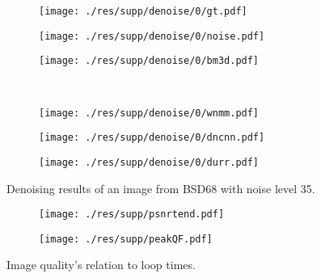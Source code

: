 \documentclass{article} %
\begin{document}
\begin{figure}[htp!]
	\centering
	\begin{subfigure}[t]{0.28\textwidth}
		\centering
		\texttt{[image: ./res/supp/denoise/0/gt.pdf]}
	\end{subfigure}
	\quad
	\begin{subfigure}[t]{0.28\textwidth}
		\centering
		\texttt{[image: ./res/supp/denoise/0/noise.pdf]}
	\end{subfigure}
	\quad
	\begin{subfigure}[t]{0.28\textwidth}
		\centering
		\texttt{[image: ./res/supp/denoise/0/bm3d.pdf]}
	\end{subfigure}\\
	\begin{subfigure}[t]{0.28\textwidth}
		\centering
		\texttt{[image: ./res/supp/denoise/0/wnmm.pdf]}
	\end{subfigure}
	\quad
	\begin{subfigure}[t]{0.28\textwidth}
		\centering
		\texttt{[image: ./res/supp/denoise/0/dncnn.pdf]}
	\end{subfigure}
	\quad
	\begin{subfigure}[t]{0.28\textwidth}
		\centering
		\texttt{[image: ./res/supp/denoise/0/durr.pdf]}
	\end{subfigure}
\caption{Denoising results of an image from BSD68 with
	noise level 35.}
\label{dn2}
	
	
	
\end{figure}

\begin{figure}[hp!]
	\centering
	\begin{subfigure}[t]{0.48\textwidth}
		\centering
		\texttt{[image: ./res/supp/psnrtend.pdf]}
	\end{subfigure}
	\quad
	\begin{subfigure}[t]{0.48\textwidth}
		\centering
		\texttt{[image: ./res/supp/peakQF.pdf]}
	\end{subfigure}
	\caption{Image quality's relation to loop times.}
	\label{psnr}
\end{figure}
\end{document}
